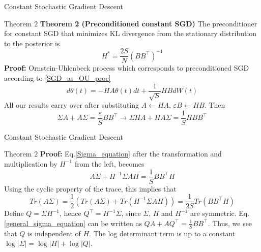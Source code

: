 \documentclass{beamer}
\begin{document}
\begin{frame}{Constant Stochastic Gradient Descent}
    \begin{block}{Theorem 2}
        \textbf{Theorem 2 (Preconditioned constant SGD)} The preconditioner for constant SGD that minimizes KL divergence from the stationary distribution to the posterior is
        \begin{equation}\label{theorem2}
            H^* = \frac{2S}{N}(BB^{\top})^{-1}
        \end{equation}
        \textbf{Proof:} Ornstein-Uhlenbeck process which corresponds to preconditioned SGD according to \ref{SGD_as_OU_proc}
        \[d\theta(t) = -HA\theta(t)dt + \frac{1}{\sqrt{S}}HBdW(t)\]
        All our results carry over after substituting $ A \leftarrow HA$, $\varepsilon B \leftarrow HB$. Then
        \[\Sigma A + A\Sigma = \frac{\varepsilon}{S}BB^{\top} \rightarrow \Sigma HA + HA\Sigma = \frac{1}{S}HBB^{\top}\]
    \end{block}
\end{frame}

\begin{frame}{Constant Stochastic Gradient Descent}
    \begin{block}{Theorem 2}
        \textbf{Proof:} Eq.\ref{Sigma_equation} after the transformation and multiplication by $H^{-1}$ from the left, becomes 
        \begin{equation}\label{general_sigma_equation}
            A\Sigma + H^{-1}\Sigma A H = \frac{1}{S}BB^{\top}H
        \end{equation}
        Using the cyclic property of the trace, this implies that
        \begin{equation}\label{ASigma_Trace_general}
            Tr(A\Sigma) = \dfrac{1}{2}(Tr(A\Sigma) + Tr(H^{-1}\Sigma AH)) = \frac{1}{2S}Tr(BB^{\top}H)
        \end{equation}
        Define $Q = \Sigma H^{-1}$, hence $Q^{\top} = H^{-1}\Sigma$, since $\Sigma$, $H$ and $H^{-1}$ are symmetric. Eq.\ref{general_sigma_equation} can be written as $QA + AQ^\top = \frac{1}{S}BB^\top$. Thus, we see that $Q$ is independent of $H$. The log determinant term is up to a constant $\log |\Sigma| = \log |H| + \log |Q|$.
    \end{block}
\end{frame}
\end{document}
